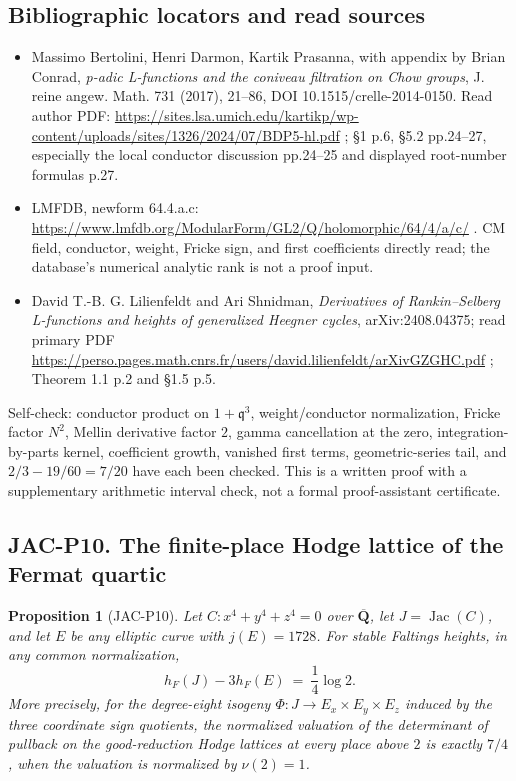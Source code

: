 \documentclass[11pt,a4paper]{article}
\newtheorem{proposition}[theorem]{Proposition}
\providecommand{\tightlist}{\setlength{\itemsep}{0pt}\setlength{\parskip}{0pt}}
\begin{document}
\subsection{Bibliographic locators and read
sources}\label{bibliographic-locators-and-read-sources}

\begin{itemize}
\tightlist
\item
  Massimo Bertolini, Henri Darmon, Kartik Prasanna, with appendix by
  Brian Conrad, \emph{p-adic L-functions and the coniveau filtration on
  Chow groups}, J. reine angew. Math. 731 (2017), 21--86, DOI
  10.1515/crelle-2014-0150. Read author PDF:
  \url{https://sites.lsa.umich.edu/kartikp/wp-content/uploads/sites/1326/2024/07/BDP5-hl.pdf}
  ; §1 p.6, §5.2 pp.24--27, especially the local conductor discussion
  pp.24--25 and displayed root-number formulas p.27.
\item
  LMFDB, newform 64.4.a.c:
  \url{https://www.lmfdb.org/ModularForm/GL2/Q/holomorphic/64/4/a/c/} . CM
  field, conductor, weight, Fricke sign, and first coefficients directly
  read; the database's numerical analytic rank is not a proof input.
\item
  David T.-B. G. Lilienfeldt and Ari Shnidman, \emph{Derivatives of
  Rankin--Selberg L-functions and heights of generalized Heegner
  cycles}, arXiv:2408.04375; read primary PDF
  \url{https://perso.pages.math.cnrs.fr/users/david.lilienfeldt/arXivGZGHC.pdf}
  ; Theorem 1.1 p.2 and §1.5 p.5.
\end{itemize}

Self-check: conductor product on \(1+\mathfrak q^3\), weight/conductor
normalization, Fricke factor \(N^2\), Mellin derivative factor \(2\),
gamma cancellation at the zero, integration-by-parts kernel, coefficient
growth, vanished first terms, geometric-series tail, and
\(2/3-19/60=7/20\) have each been checked. This is a written proof with
a supplementary arithmetic interval check, not a formal proof-assistant
certificate.

\subsection*{JAC-P10. The finite-place Hodge lattice of the Fermat quartic}

\begin{proposition}[JAC-P10]
\label{jac:P10}
Let $C:x^4+y^4+z^4=0$ over $\overline{\mathbf Q}$, let
$J=\operatorname{Jac}(C)$, and let $E$ be any elliptic curve with
$j(E)=1728$. For stable Faltings heights, in any common normalization,
\[
 h_F(J)-3h_F(E)\ =\ \frac14\log 2.                 \tag{JAC.P10.1}
\]
More precisely, for the degree-eight isogeny
$\Phi:J\to E_x\times E_y\times E_z$ induced by the three coordinate
sign quotients, the normalized valuation of the determinant of
pullback on the good-reduction Hodge lattices at every place above
$2$ is exactly $7/4$, when the valuation is normalized by $\nu(2)=1$.
\end{proposition}
\end{document}

